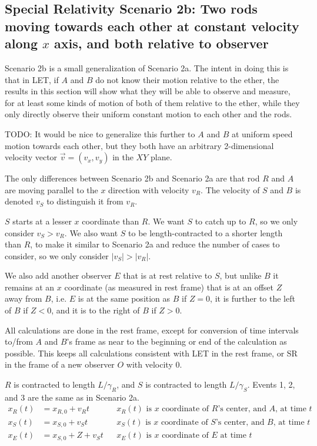 \documentclass[a4paper]{article}
\theoremstyle{plain}
\theoremstyle{definition}
\newcommand{\vect}[1]{\vec{#1}}
\begin{document}
\subsection{Special Relativity Scenario 2b: Two rods moving towards each other at constant velocity along $x$ axis, and both relative to observer}
\label{sec:scen2b}

Scenario 2b is a small generalization of Scenario 2a.  The intent in
doing this is that in LET, if $A$ and $B$ do not know their motion
relative to the ether, the results in this section will show what they
will be able to observe and measure, for at least some kinds of motion
of both of them relative to the ether, while they only directly
observe their uniform constant motion to each other and the rods.

TODO: It would be nice to generalize this further to $A$ and $B$ at
uniform speed motion towards each other, but they both have an
arbitrary 2-dimensional velocity vector $\vect v = (v_x, v_y)$ in the
$XY$ plane.

The only differences between Scenario 2b and Scenario 2a are that rod
$R$ and $A$ are moving parallel to the $x$ direction with velocity
$v_R$.  The velocity of $S$ and $B$ is denoted $v_S$ to distinguish it
from $v_R$.

$S$ starts at a lesser $x$ coordinate than $R$.  We want $S$ to catch
up to $R$, so we only consider $v_S > v_R$.  We also want $S$ to be
length-contracted to a shorter length than $R$, to make it similar to
Scenario 2a and reduce the number of cases to consider, so we only
consider $|v_S| > |v_R|$.

We also add another observer $E$ that is at rest relative to $S$, but
unlike $B$ it remains at an $x$ coordinate (as measured in rest frame)
that is at an offset $Z$ away from $B$, i.e. $E$ is at the same
position as $B$ if $Z=0$, it is further to the left of $B$ if $Z < 0$,
and it is to the right of $B$ if $Z > 0$.

All calculations are done in the rest frame, except for conversion of
time intervals to/from $A$ and $B$'s frame as near to the beginning or
end of the calculation as possible.  This keeps all calculations
consistent with LET in the rest frame, or SR in the frame of a new
observer $O$ with velocity 0.

$R$ is contracted to length $L/\gamma_{R}$,
and $S$ is contracted to length $L/\gamma_{S}$.
Events 1, 2, and 3 are the same as in Scenario 2a.
\begin{align}
x_R(t) & = x_{R,0} + v_R t & & \text{$x_R(t)$ is $x$ coordinate of $R$'s center, and $A$, at time $t$} \label{eqn:scen2b-R-xcoord} \\
x_S(t) & = x_{S,0} + v_S t & & \text{$x_S(t)$ is $x$ coordinate of $S$'s center, and $B$, at time $t$} \label{eqn:scen2b-S-xcoord} \\
x_E(t) & = x_{S,0} + Z + v_S t & & \text{$x_E(t)$ is $x$ coordinate of $E$ at time $t$} \label{eqn:scen2b-E-xcoord}
\end{align}
\end{document}
